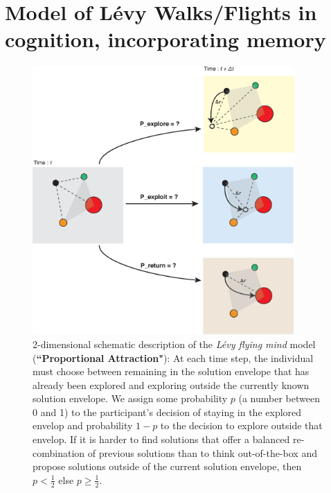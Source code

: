 \section{Model of L\'evy Walks/Flights in cognition, incorporating memory}


\begin{figure}[h!]
\begin{center}
\includegraphics[width=10cm]{figures/schematic_displacement.eps}
\caption{\footnotesize{2-dimensional schematic description of the {\it L\'evy flying mind} model ({\bf ``Proportional Attraction"}): At each time step, the individual must choose between remaining in the solution envelope that has already been explored and exploring outside the currently known solution envelope.  We assign some probability $p$ (a number between 0 and 1) to the participant's decision of staying in the explored envelop and probability $1-p$ to the decision to explore outside that envelop.  If it is harder to find solutions that offer a balanced re-combination of previous solutions than to think out-of-the-box and propose solutions outside of the current solution envelope, then $p < \frac{1}{2}$ else $p \geq \frac{1}{2}$.}}
\label{fig:schematic}
\end{center}
\end{figure}





